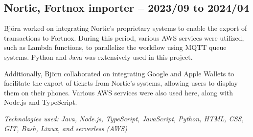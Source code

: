 \subsection*{\textcolor{colorTitelErfarenhet}{Nortic, Fortnox importer – 2023/09 to 2024/04}}
Björn worked on integrating Nortic's proprietary systems to enable the export of transactions to Fortnox. During this period, various AWS services were utilized, such as Lambda functions, to parallelize the workflow using MQTT queue systems. Python and Java was extensively used in this project.

Additionally, Björn collaborated on integrating Google and Apple Wallets to facilitate the export of tickets from Nortic's systems, allowing users to display them on their phones. Various AWS services were also used here, along with Node.js and TypeScript.

\vspace{5pt}\textit{Technologies used: Java, Node.js, TypeScript, JavaScript, Python, HTML, CSS, GIT, Bash, Linux, and serverless (AWS)}
